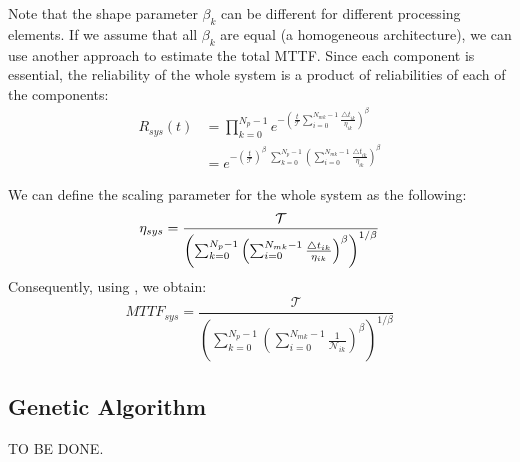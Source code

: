 Note that the shape parameter $\beta_k$ can be different for different processing elements. If we assume that all $\beta_k$ are equal (a homogeneous architecture), we can use another approach to estimate the total MTTF. Since each component is essential, the reliability of the whole system is a product of reliabilities of each of the components:
\begin{align*}
  R_{sys}(t) & = \prod_{k=0}^{N_p - 1} e^{-\left( \frac{t}{\mathcal{T}} \sum_{i=0}^{N_{mk} - 1} \frac{\triangle t_{ik}}{\eta_{ik}} \right)^{\beta}} \\
  & = e^{- \left(\frac{t}{\mathcal{T}}\right)^{\beta} \; \sum_{k = 0}^{N_p - 1} \left( \sum_{i=0}^{N_{mk} - 1} \frac{\triangle t_{ik}}{\eta_{ik}} \right)^{\beta}}
\end{align*}

We can define the scaling parameter for the whole system as the following:
\[
  \eta_{sys} = \frac{\mathcal{T}}{\left(\sum_{k=0}^{N_p - 1} \left(\sum_{i=0}^{N_{mk} - 1}\frac{\triangle t_{ik}}{\eta_{ik}}\right)^{\beta} \right)^{1/\beta}} \\
\]
Consequently, using , we obtain:
\[
  MTTF_{sys} = \frac{\mathcal{T}}{\left(\sum_{k=0}^{N_p - 1} \left(\sum_{i=0}^{N_{mk} - 1}\frac{1}{\mathcal{N}_{ik}}\right)^{\beta} \right)^{1/\beta}}
\]

\subsection{Genetic Algorithm}
TO BE DONE.
